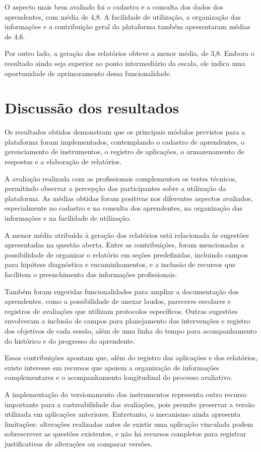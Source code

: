 O aspecto mais bem avaliado foi o cadastro e a consulta dos dados dos aprendentes, com média de 4,8. A facilidade de utilização, a organização das informações e a contribuição geral da plataforma também apresentaram médias de 4,6.

Por outro lado, a geração dos relatórios obteve a menor média, de 3,8. Embora o resultado ainda seja superior ao ponto intermediário da escala, ele indica uma oportunidade de aprimoramento dessa funcionalidade.

\section{Discussão dos resultados}

Os resultados obtidos demonstram que os principais módulos previstos para a plataforma foram implementados, contemplando o cadastro de aprendentes, o gerenciamento de instrumentos, o registro de aplicações, o armazenamento de respostas e a elaboração de relatórios.

A avaliação realizada com as profissionais complementou os testes técnicos, permitindo observar a percepção das participantes sobre a utilização da plataforma. As médias obtidas foram positivas nos diferentes aspectos avaliados, especialmente no cadastro e na consulta dos aprendentes, na organização das informações e na facilidade de utilização.

A menor média atribuída à geração dos relatórios está relacionada às sugestões apresentadas na questão aberta. Entre as contribuições, foram mencionadas a possibilidade de organizar o relatório em seções predefinidas, incluindo campos para hipótese diagnóstica e encaminhamentos, e a inclusão de recursos que facilitem o preenchimento das informações profissionais.

Também foram sugeridas funcionalidades para ampliar a documentação dos aprendentes, como a possibilidade de anexar laudos, pareceres escolares e registros de avaliações que utilizam protocolos específicos. Outras sugestões envolveram a inclusão de campos para planejamento das intervenções e registro dos objetivos de cada sessão, além de uma linha do tempo para acompanhamento do histórico e do progresso do aprendente.

Essas contribuições apontam que, além do registro das aplicações e dos relatórios, existe interesse em recursos que apoiem a organização de informações complementares e o acompanhamento longitudinal do processo avaliativo.

A implementação do versionamento dos instrumentos representa outro recurso importante para a rastreabilidade das avaliações, pois permite preservar a versão utilizada em aplicações anteriores. Entretanto, o mecanismo ainda apresenta limitações: alterações realizadas antes de existir uma aplicação vinculada podem sobrescrever as questões existentes, e não há recursos completos para registrar justificativas de alterações ou comparar versões.

